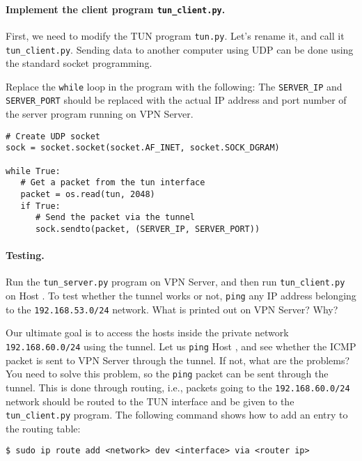\paragraph{Implement the client program \texttt{tun\_client.py}.}
First, we need to modify the TUN program \texttt{tun.py}. Let's rename it, and call it 
\texttt{tun\_client.py}.  Sending data to another computer using UDP
can be done using the standard socket programming. 

Replace the \texttt{while} loop in the program with the following: 
The \texttt{SERVER\_IP} and \texttt{SERVER\_PORT} should be   
replaced with the actual IP address and port number of the server program running
on VPN Server.

\begin{lstlisting}
# Create UDP socket
sock = socket.socket(socket.AF_INET, socket.SOCK_DGRAM)

while True:
   # Get a packet from the tun interface
   packet = os.read(tun, 2048)
   if True:
      # Send the packet via the tunnel
      sock.sendto(packet, (SERVER_IP, SERVER_PORT))
\end{lstlisting}




\paragraph{Testing.} 
Run the \texttt{tun\_server.py} program on VPN Server, and then
run \texttt{tun\_client.py} on Host \hostu. To test whether the 
tunnel works or not,  \texttt{ping} any IP address belonging to the \texttt{192.168.53.0/24} network.  
What is printed out on VPN Server? Why? 


Our ultimate goal is to access the hosts inside the 
private network \texttt{192.168.60.0/24} using the tunnel. Let us 
\texttt{ping} Host \hostv, and see whether the ICMP packet is
sent to VPN Server through the tunnel. If not, what are the problems?
You need to solve this problem, so the \texttt{ping} packet can
be sent through the tunnel. This is done through routing, i.e., packets going to
the \texttt{192.168.60.0/24} network should be routed to the TUN interface and 
be given to the \texttt{tun\_client.py} program.  
The following command shows how to add an entry to the routing table:


\begin{lstlisting}
$ sudo ip route add <network> dev <interface> via <router ip>
\end{lstlisting}
 

